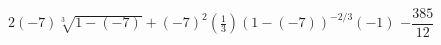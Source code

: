 {$2(-7)\sqrt[3]{1-(-7)} + (-7)^2 \left(\frac{1}{3}\right)(1-(-7))^{-2/3}(-1)$ }
{$-\dfrac{385}{12}$}